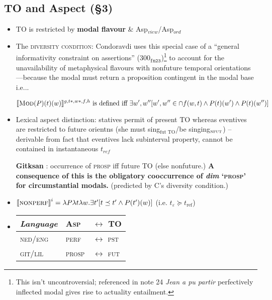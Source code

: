 \documentclass[10pt]{article}
\newcommand{\denote}[1]{\mbox{$[\![\mbox{#1}]\!]$}}
\begin{document}
\subsection{TO and Aspect (§3)}
\begin{itemize}
	\item TO is restricted by \textbf{modal flavour} \& Asp$_{view} $/Asp$_{ord}$
	\item The \textsc{diversity condition}: Condoravdi uses this special case of a ``general informativity constraint on assertions'' (300$ _{\texttt{fn23}} $)\footnote{This isn't uncontroversial; referenced in note 24 \textit{Jean a pu partir} perfectively inflected modal gives rise to actuality entailment.} to account for the unavailability of metaphysical flavours with nonfuture temporal orientations---because the modal must return a proposition contingent in the modal base i.e...
	
	\[ \llbracket\textsc{Mod}(P)(t)(w)\rrbracket^{g,t*,w*,f,h}\text{ is defined iff } \exists w',w''[w',w''\in\cap f(w,t)\wedge P(t)(w')\wedge P(t)(w'')] \]
	
	\item Lexical aspect distinction: statives permit of present TO whereas eventives are restricted to future orientns (she must sing$_{\text{fut TO}}$/be singing$ _{\textsc{nfut}} $) -- derivable from fact that eventives lack subinterval property, cannot be contained in instantaneous $t_{ref}$
	\item[\textbf{Gitksan}] : occurrence of \textsc{prosp} iff future TO (else nonfuture.) \textbf{A consequence of this is the obligatory cooccurrence of \textit{dim} `\textsc{prosp'} for circumstantial modals.} (predicted by C's diversity condition.)
	
	\item $\denote{\textsc{nonperf}}^i=\lambda P\lambda t\lambda w.\exists t'[t\preceq t'\wedge P(t')(w)]$ (i.e. $t_\varepsilon\succeq t_{\text{ref}}$)
	
	\item\begin{tabular}{lll}
		\textit{Language} & \textsc{Asp} &$ \leftrightarrow $\textbf{ TO}\\\midrule
		\textsc{ned/eng} & \textsc{perf} &$\leftrightarrow$ \textsc{pst }\\
		\textsc{git/lil} & \textsc{prosp} &$ \leftrightarrow $ \textsc{fut}
	\end{tabular}
	
\end{itemize}
\end{document}

